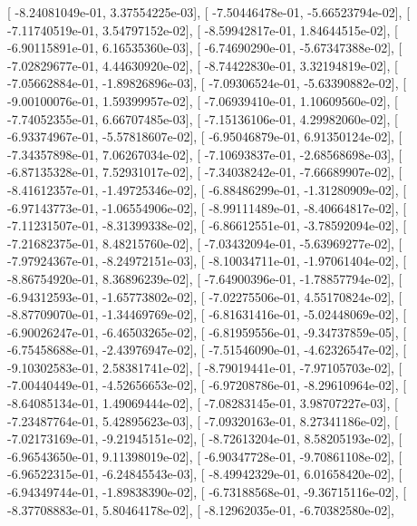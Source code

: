 \documentclass{article}
\begin{document}
       [ -8.24081049e-01,   3.37554225e-03],
       [ -7.50446478e-01,  -5.66523794e-02],
       [ -7.11740519e-01,   3.54797152e-02],
       [ -8.59942817e-01,   1.84644515e-02],
       [ -6.90115891e-01,   6.16535360e-03],
       [ -6.74690290e-01,  -5.67347388e-02],
       [ -7.02829677e-01,   4.44630920e-02],
       [ -8.74422830e-01,   3.32194819e-02],
       [ -7.05662884e-01,  -1.89826896e-03],
       [ -7.09306524e-01,  -5.63390882e-02],
       [ -9.00100076e-01,   1.59399957e-02],
       [ -7.06939410e-01,   1.10609560e-02],
       [ -7.74052355e-01,   6.66707485e-03],
       [ -7.15136106e-01,   4.29982060e-02],
       [ -6.93374967e-01,  -5.57818607e-02],
       [ -6.95046879e-01,   6.91350124e-02],
       [ -7.34357898e-01,   7.06267034e-02],
       [ -7.10693837e-01,  -2.68568698e-03],
       [ -6.87135328e-01,   7.52931017e-02],
       [ -7.34038242e-01,  -7.66689907e-02],
       [ -8.41612357e-01,  -1.49725346e-02],
       [ -6.88486299e-01,  -1.31280909e-02],
       [ -6.97143773e-01,  -1.06554906e-02],
       [ -8.99111489e-01,  -8.40664817e-02],
       [ -7.11231507e-01,  -8.31399338e-02],
       [ -6.86612551e-01,  -3.78592094e-02],
       [ -7.21682375e-01,   8.48215760e-02],
       [ -7.03432094e-01,  -5.63969277e-02],
       [ -7.97924367e-01,  -8.24972151e-03],
       [ -8.10034711e-01,  -1.97061404e-02],
       [ -8.86754920e-01,   8.36896239e-02],
       [ -7.64900396e-01,  -1.78857794e-02],
       [ -6.94312593e-01,  -1.65773802e-02],
       [ -7.02275506e-01,   4.55170824e-02],
       [ -8.87709070e-01,  -1.34469769e-02],
       [ -6.81631416e-01,  -5.02448069e-02],
       [ -6.90026247e-01,  -6.46503265e-02],
       [ -6.81959556e-01,  -9.34737859e-05],
       [ -6.75458688e-01,  -2.43976947e-02],
       [ -7.51546090e-01,  -4.62326547e-02],
       [ -9.10302583e-01,   2.58381741e-02],
       [ -8.79019441e-01,  -7.97105703e-02],
       [ -7.00440449e-01,  -4.52656653e-02],
       [ -6.97208786e-01,  -8.29610964e-02],
       [ -8.64085134e-01,   1.49069444e-02],
       [ -7.08283145e-01,   3.98707227e-03],
       [ -7.23487764e-01,   5.42895623e-03],
       [ -7.09320163e-01,   8.27341186e-02],
       [ -7.02173169e-01,  -9.21945151e-02],
       [ -8.72613204e-01,   8.58205193e-02],
       [ -6.96543650e-01,   9.11398019e-02],
       [ -6.90347728e-01,  -9.70861108e-02],
       [ -6.96522315e-01,  -6.24845543e-03],
       [ -8.49942329e-01,   6.01658420e-02],
       [ -6.94349744e-01,  -1.89838390e-02],
       [ -6.73188568e-01,  -9.36715116e-02],
       [ -8.37708883e-01,   5.80464178e-02],
       [ -8.12962035e-01,  -6.70382580e-02],
\end{document}
